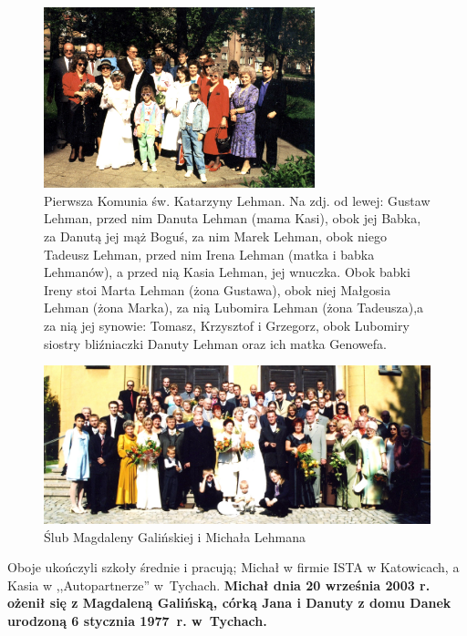 \begin{figure}[!h]
\begin{center}
\includegraphics[width=0.7\textwidth]{photo/katarzyna_lehman_komunia.jpg}
\caption[Pierwsza Komunia św. Katarzyny Lehman]{Pierwsza Komunia św. Katarzyny Lehman. Na zdj. od lewej: Gustaw Lehman, przed nim Danuta Lehman (mama Kasi), obok jej Babka, za Danutą jej mąż Boguś, za nim Marek Lehman, obok niego Tadeusz Lehman, przed nim Irena Lehman (matka i babka Lehmanów), a przed nią Kasia Lehman, jej wnuczka. Obok babki Ireny stoi Marta Lehman (żona Gustawa), obok niej Małgosia Lehman (żona Marka), za nią Lubomira Lehman (żona Tadeusza),a za nią jej synowie: Tomasz, Krzysztof i Grzegorz, obok Lubomiry siostry bliźniaczki Danuty Lehman oraz ich matka Genowefa. }
\end{center}
\end{figure}

\begin{figure}
\begin{center}
\includegraphics[width=240mm]{photo/michal_magdalena_lehman_slub.jpg}
\caption{Ślub Magdaleny Galińskiej i Michała Lehmana}
\end{center}
\end{figure}

Oboje ukończyli szkoły średnie i pracują; Michał w firmie ISTA w Katowicach, a Kasia w ,,Autopartnerze'' w~Tychach. \textbf{Michał dnia 20 września 2003 r. ożenił się z Magdaleną Galińską, córką Jana i Danuty z domu Danek urodzoną 6 stycznia 1977~r. w~Tychach.}

